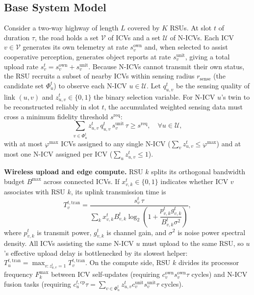 \documentclass[conference]{IEEEtran}
\begin{document}
\subsection{Base System Model}
Consider a two-way highway of length $L$ covered by $K$ RSUs. At slot $t$ of duration $\tau$, the road holds a set $\mathcal{V}$ of ICVs and a set $\mathcal{U}$ of N-ICVs. Each ICV $v\in\mathcal{V}$ generates its own telemetry at rate $s^{\mathrm{own}}_v$ and, when selected to assist cooperative perception, generates object reports at rate $s^{\mathrm{unit}}_v$, giving a total upload rate $s^t_v = s^{\mathrm{own}}_v + s^{\mathrm{unit}}_v$. Because N-ICVs cannot transmit their own status, the RSU recruits a subset of nearby ICVs within sensing radius $r_{\mathrm{sense}}$ (the candidate set $\Phi^t_u$) to observe each N-ICV $u\in\mathcal{U}$. Let $q^t_{u,v}$ be the sensing quality of link $(u,v)$ and $z^t_{u,v}\in\{0,1\}$ the binary selection variable. For N-ICV $u$'s twin to be reconstructed reliably in slot $t$, the accumulated weighted sensing data must cross a minimum fidelity threshold $s^{\mathrm{req}}$:
\begin{equation}
\sum_{v\in\Phi^t_u} z^t_{u,v}\, q^t_{u,v}\, s^{\mathrm{unit}}_v\, \tau \ge s^{\mathrm{req}},\quad \forall u\in\mathcal{U},
\label{eq:perc}
\end{equation}
with at most $\varphi^{\max}$ ICVs assigned to any single N-ICV ($\sum_v z^t_{u,v}\le \varphi^{\max}$) and at most one N-ICV assigned per ICV ($\sum_u z^t_{u,v}\le 1$).

\textbf{Wireless upload and edge compute.} RSU $k$ splits its orthogonal bandwidth budget $B^{\max}$ across connected ICVs. If $x^t_{v,k}\in\{0,1\}$ indicates whether ICV $v$ associates with RSU $k$, its uplink transmission time is
\begin{equation}
T^{t,\mathrm{tran}}_v=\frac{s^t_v\,\tau}{\sum_{k}x^t_{v,k}B^t_{v,k}\log_2\!\left(1+\dfrac{p^t_{v,k}g^t_{v,k}}{B^t_{v,k}\sigma^2}\right)},
\label{eq:tran}
\end{equation}
where $p^t_{v,k}$ is transmit power, $g^t_{v,k}$ is channel gain, and $\sigma^2$ is noise power spectral density. All ICVs assisting the same N-ICV $u$ must upload to the same RSU, so $u$'s effective upload delay is bottlenecked by its slowest helper: $T^{t,\mathrm{tran}}_u = \max_{v: z^t_{u,v}=1} T^{t,\mathrm{tran}}_v$. On the compute side, RSU $k$ divides its processor frequency $F^{\max}_k$ between ICV self-updates (requiring $c^{\mathrm{own}}_v s^{\mathrm{own}}_v \tau$ cycles) and N-ICV fusion tasks (requiring $c^{t,\mathrm{cp}}_u \tau = \sum_{v\in\Phi^t_u} z^t_{u,v} c^{\mathrm{unit}}_v s^{\mathrm{unit}}_v \tau$ cycles).
\end{document}
